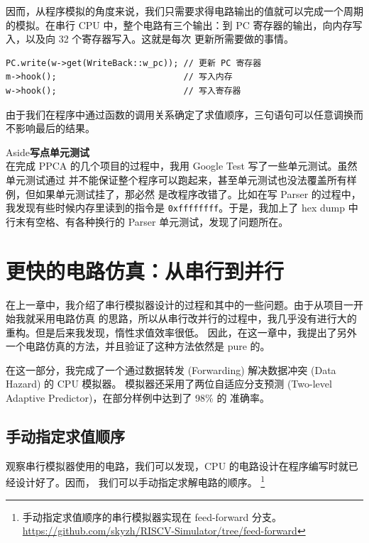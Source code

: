 \documentclass[12pt]{article}
\newenvironment{aside}[1]
    { \begin{tcolorbox}[enlarge top by=0.5cm, enlarge bottom by=0.5cm] Aside\space\space\space\space \textbf{#1} \\
        } { \end{tcolorbox} }
\begin{document}
    因而，从程序模拟的角度来说，我们只需要求得电路输出的值就可以完成一个周期的模拟。在串行 CPU
    中，整个电路有三个输出：到 PC 寄存器的输出，向内存写入，以及向 32 个寄存器写入。这就是每次
    更新所需要做的事情。

    \begin{verbatim}
PC.write(w->get(WriteBack::w_pc)); // 更新 PC 寄存器
m->hook();                         // 写入内存
w->hook();                         // 写入寄存器
    \end{verbatim}

    由于我们在程序中通过函数的调用关系确定了求值顺序，三句语句可以任意调换而不影响最后的结果。

    \begin{aside}{写点单元测试}
        在完成 PPCA 的几个项目的过程中，我用 Google Test 写了一些单元测试。虽然单元测试通过
        并不能保证整个程序可以跑起来，甚至单元测试也没法覆盖所有样例，但如果单元测试挂了，那必然
        是改程序改错了。比如在写 Parser 的过程中，我发现有些时候内存里读到的指令是 
        \texttt{0xffffffff}。于是，我加上了 hex dump 中行末有空格、有各种换行的 Parser
        单元测试，发现了问题所在。
    \end{aside}

    \section{更快的电路仿真：从串行到并行}

    在上一章中，我介绍了串行模拟器设计的过程和其中的一些问题。由于从项目一开始我就采用电路仿真
    的思路，所以从串行改并行的过程中，我几乎没有进行大的重构。但是后来我发现，惰性求值效率很低。
    因此，在这一章中，我提出了另外一个电路仿真的方法，并且验证了这种方法依然是 pure 的。
    
    在这一部分，我完成了一个通过数据转发 (Forwarding) 解决数据冲突 (Data Hazard) 的 CPU 模拟器。
    模拟器还采用了两位自适应分支预测 (Two-level Adaptive Predictor)，在部分样例中达到了 98\% 的
    准确率。

    \subsection{手动指定求值顺序}

    观察串行模拟器使用的电路，我们可以发现，CPU 的电路设计在程序编写时就已经设计好了。因而，
    我们可以手动指定求解电路的顺序。
    \footnote{手动指定求值顺序的串行模拟器实现在 feed-forward 分支。
        \url{https://github.com/skyzh/RISCV-Simulator/tree/feed-forward}}
\end{document}

